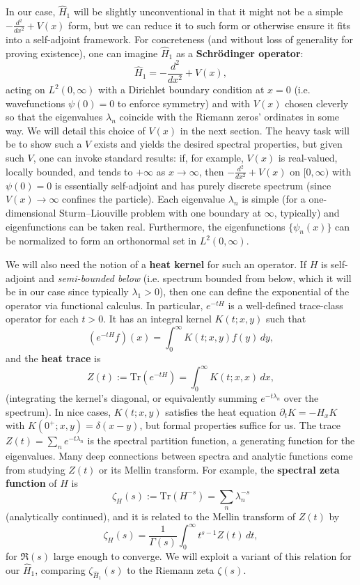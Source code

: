 \documentclass[12pt]{article}
\theoremstyle{plain}
\theoremstyle{definition}
\begin{document}
In our case, \(\hat{H}_1\) will be slightly unconventional in that it might not be a simple \(-\frac{d^2}{dx^2} + V(x)\) form, but we can reduce it to such form or otherwise ensure it fits into a self-adjoint framework. For concreteness (and without loss of generality for proving existence), one can imagine \(\hat{H}_1\) as a \textbf{Schr\"odinger operator}:
\[
\hat{H}_1 = -\frac{d^2}{dx^2} + V(x),
\]
acting on \(L^2(0,\infty)\) with a Dirichlet boundary condition at \(x=0\) (i.e. wavefunctions \(\psi(0)=0\) to enforce symmetry) and with \(V(x)\) chosen cleverly so that the eigenvalues \(\lambda_n\) coincide with the Riemann zeros' ordinates in some way. We will detail this choice of \(V(x)\) in the next section. The heavy task will be to show such a \(V\) exists and yields the desired spectral properties, but given such \(V\), one can invoke standard results: if, for example, \(V(x)\) is real-valued, locally bounded, and tends to \(+\infty\) as \(x\to\infty\), then \(-\frac{d^2}{dx^2}+V(x)\) on \([0,\infty)\) with \(\psi(0)=0\) is essentially self-adjoint and has purely discrete spectrum (since \(V(x)\to\infty\) confines the particle). Each eigenvalue \(\lambda_n\) is simple (for a one-dimensional Sturm--Liouville problem with one boundary at \(\infty\), typically) and eigenfunctions can be taken real. Furthermore, the eigenfunctions \(\{\psi_n(x)\}\) can be normalized to form an orthonormal set in \(L^2(0,\infty)\).

We will also need the notion of a \textbf{heat kernel} for such an operator. If \(H\) is self-adjoint and \emph{semi-bounded below} (i.e. spectrum bounded from below, which it will be in our case since typically \(\lambda_1>0\)), then one can define the exponential of the operator via functional calculus. In particular, \(e^{-tH}\) is a well-defined trace-class operator for each \(t>0\). It has an integral kernel \(K(t;x,y)\) such that 
\[
(e^{-tH}f)(x) = \int_0^\infty K(t;x,y) f(y)\,dy,
\]
and the \textbf{heat trace} is 
\[
Z(t) := \mathrm{Tr}(e^{-tH}) = \int_0^\infty K(t;x,x)\,dx,
\]
(integrating the kernel's diagonal, or equivalently summing \(e^{-t\lambda_n}\) over the spectrum). In nice cases, \(K(t;x,y)\) satisfies the heat equation \(\partial_t K = -H_x K\) with \(K(0^+;x,y)=\delta(x-y)\), but formal properties suffice for us. The trace \(Z(t)=\sum_n e^{-t\lambda_n}\) is the spectral partition function, a generating function for the eigenvalues. Many deep connections between spectra and analytic functions come from studying \(Z(t)\) or its Mellin transform. For example, the \textbf{spectral zeta function} of \(H\) is 
\[
\zeta_H(s) := \mathrm{Tr}(H^{-s}) = \sum_n \lambda_n^{-s}
\]
(analytically continued), and it is related to the Mellin transform of \(Z(t)\) by 
\[
\zeta_H(s) = \frac{1}{\Gamma(s)}\int_0^\infty t^{s-1} Z(t)\,dt,
\]
for \(\Re(s)\) large enough to converge. We will exploit a variant of this relation for our \(\hat{H}_1\), comparing \(\zeta_{\hat{H}_1}(s)\) to the Riemann zeta \(\zeta(s)\).
\end{document}
